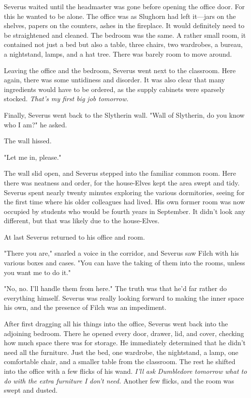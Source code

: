 Severus waited until the headmaster was gone before opening the office door. For this he wanted to be alone. The office was as Slughorn had left it—jars on the shelves, papers on the counters, ashes in the fireplace. It would definitely need to be straightened and cleaned. The bedroom was the same. A rather small room, it contained not just a bed but also a table, three chairs, two wardrobes, a bureau, a nightstand, lamps, and a hat tree. There was barely room to move around.

Leaving the office and the bedroom, Severus went next to the classroom. Here again, there was some untidiness and disorder. It was also clear that many ingredients would have to be ordered, as the supply cabinets were sparsely stocked. \emph{That's my first big job tomorrow.}

Finally, Severus went back to the Slytherin wall. "Wall of Slytherin, do you know who I am?" he asked.

The wall hissed.

"Let me in, please."

The wall slid open, and Severus stepped into the familiar common room. Here there was neatness and order, for the house-Elves kept the area swept and tidy. Severus spent nearly twenty minutes exploring the various dormitories, seeing for the first time where his older colleagues had lived. His own former room was now occupied by students who would be fourth years in September. It didn't look any different, but that was likely due to the house-Elves.

At last Severus returned to his office and room.

"There you are," snarled a voice in the corridor, and Severus saw Filch with his various boxes and cases. "You can have the taking of them into the rooms, unless you want me to do it."

"No, no. I'll handle them from here." The truth was that he'd far rather do everything himself. Severus was really looking forward to making the inner space his own, and the presence of Filch was an impediment.

After first dragging all his things into the office, Severus went back into the adjoining bedroom. There he opened every door, drawer, lid, and cover, checking how much space there was for storage. He immediately determined that he didn't need all the furniture. Just the bed, one wardrobe, the nightstand, a lamp, one comfortable chair, and a smaller table from the classroom. The rest he shifted into the office with a few flicks of his wand. \emph{I'll ask Dumbledore tomorrow what to do with the extra furniture I don't need.} Another few flicks, and the room was swept and dusted.

